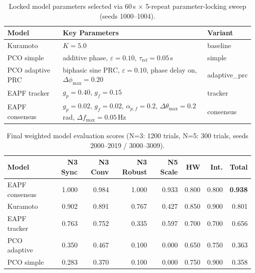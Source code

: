 
\begin{table}[htbp]
\centering
\caption{Locked model parameters selected via 60\,s $\times$ 5-repeat
         parameter-locking sweep (seeds 1000--1004).}
\label{tab:locked}
\begin{tabular}{@{}lll@{}}
\toprule
\textbf{Model} & \textbf{Key Parameters} & \textbf{Variant} \\
\midrule
Kuramoto & $K = 5.0$ & baseline \\
PCO simple & additive phase, $\varepsilon = 0.10$, $\tau_{\text{ref}} = 0.05$\,s & simple \\
PCO adaptive PRC & biphasic sine PRC, $\varepsilon = 0.10$, phase delay on,
                  $\Delta\phi_{\max} = 0.20$ & adaptive\_prc \\
EAPF tracker & $g_p = 0.40$, $g_f = 0.15$ & tracker \\
EAPF consensus & $g_p = 0.02$, $g_f = 0.02$, $\alpha_{p,f} = 0.2$,
                 $\Delta\theta_{\max} = 0.2$\,rad, $\Delta f_{\max} = 0.05$\,Hz & consensus \\
\bottomrule
\end{tabular}
\end{table}

\begin{table}[htbp]
\centering
\caption{Final weighted model evaluation scores (N=3: 1200 trials, N=5: 300 trials,
         seeds 2000--2019 / 3000--3009).}
\label{tab:scores}
\begin{tabular}{@{}lrrrrrrr@{}}
\toprule
\textbf{Model} & \textbf{N3 Sync} & \textbf{N3 Conv} & \textbf{N3 Robust}
               & \textbf{N5 Scale} & \textbf{HW} & \textbf{Int.} & \textbf{Total} \\
\midrule
EAPF consensus & 1.000 & 0.984 & 1.000 & 0.933 & 0.800 & 0.800 & \textbf{0.938} \\
Kuramoto       & 0.902 & 0.891 & 0.767 & 0.427 & 0.850 & 0.900 & 0.801 \\
EAPF tracker   & 0.763 & 0.752 & 0.335 & 0.597 & 0.700 & 0.700 & 0.656 \\
PCO adaptive   & 0.350 & 0.467 & 0.100 & 0.000 & 0.650 & 0.750 & 0.363 \\
PCO simple     & 0.283 & 0.370 & 0.100 & 0.000 & 0.750 & 0.900 & 0.358 \\
\bottomrule
\end{tabular}
\end{table}

